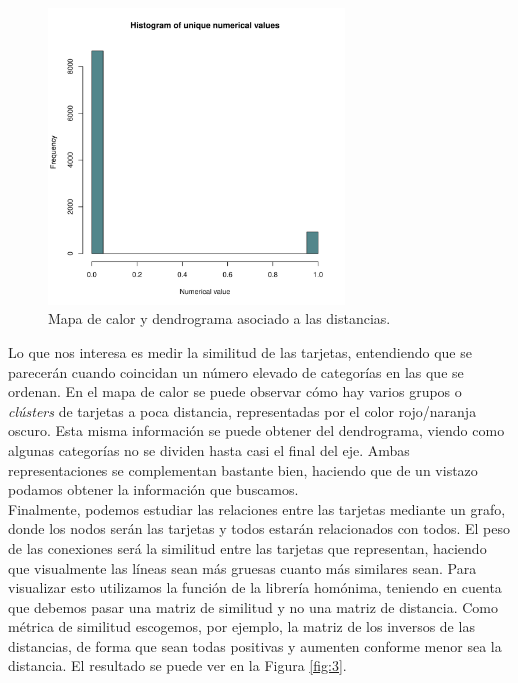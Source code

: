 \documentclass[11pt,a4paper]{article}
\begin{document}
\begin{figure}[h!]
  \centering
  \includegraphics[page=2, width=0.7\textwidth]{Rplots.pdf}
  \caption{Mapa de calor y dendrograma asociado a las distancias.}
  \label{fig:2}
\end{figure}

Lo que nos interesa es medir la similitud de las tarjetas, entendiendo que se parecerán cuando coincidan un número elevado de categorías en las que se ordenan. En el mapa de calor se puede observar cómo hay varios grupos o \textit{clústers} de tarjetas a poca distancia, representadas por el color rojo/naranja oscuro. Esta misma información se puede obtener del dendrograma, viendo como algunas categorías no se dividen hasta casi el final del eje. Ambas representaciones se complementan bastante bien, haciendo que de un vistazo podamos obtener la información que buscamos.\\

Finalmente, podemos estudiar las relaciones entre las tarjetas mediante un grafo, donde los nodos serán las tarjetas y todos estarán relacionados con todos. El peso de las conexiones será la similitud entre las tarjetas que representan, haciendo que visualmente las líneas sean más gruesas cuanto más similares sean. Para visualizar esto utilizamos la función \verb@qgraph@ de la librería homónima, teniendo en cuenta que debemos pasar una matriz de similitud y no una matriz de distancia. Como métrica de similitud escogemos, por ejemplo, la matriz de los inversos de las distancias, de forma que sean todas positivas y aumenten conforme menor sea la distancia. El resultado se puede ver en la Figura \ref{fig:3}.
\end{document}
